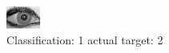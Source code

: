 \begin{figure}[h!]
\begin{center}
\includegraphics[width=0.60\columnwidth]{figures/ID2028_class_1_target_2.png}
\end{center}
\caption{ Classification: 1 actual target: 2}
\label{fig:ID2028_class_1_target_2}
\end{figure}
